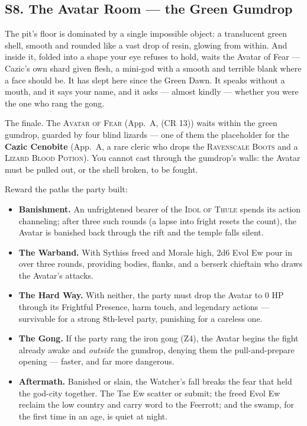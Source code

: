 \documentclass[10pt,twoside]{article}
\newcommand{\CR}[1]{\textnormal{(CR #1)}}
\newcommand{\eqname}[1]{\textsc{#1}}
\begin{document}
\subsection{S8. The Avatar Room --- the Green Gumdrop}
\begin{readaloud}
The pit's floor is dominated by a single impossible object: a translucent green shell,
smooth and rounded like a vast drop of resin, glowing from within. And inside it,
folded into a shape your eye refuses to hold, waits the Avatar of Fear --- Cazic's own
shard given flesh, a mini-god with a smooth and terrible blank where a face should be.
It has slept here since the Green Dawn. It speaks without a mouth, and it says your
name, and it asks --- almost kindly --- whether you were the one who rang the gong.
\end{readaloud}
The finale. The \eqname{Avatar of Fear} (App.\ A, \CR{13}) waits within the green
gumdrop, guarded by four blind lizards --- one of them the placeholder for the
\textbf{Cazic Cenobite} (App.\ A, a rare cleric who drops the \eqname{Ravenscale
Boots} and a \eqname{Lizard Blood Potion}). You cannot cast through the gumdrop's
walls: the Avatar must be pulled out, or the shell broken, to be fought.

\begin{dmnote}
Reward the paths the party built:
\begin{itemize}
\item \textbf{Banishment.} An unfrightened bearer of the \eqname{Idol of Thule} spends
its action channeling; after three such rounds (a lapse into fright resets the count),
the Avatar is banished back through the rift and the temple falls silent.
\item \textbf{The Warband.} With Sythiss freed and Morale high, 2d6 Evol Ew pour in
over three rounds, providing bodies, flanks, and a berserk chieftain who draws the
Avatar's attacks.
\item \textbf{The Hard Way.} With neither, the party must drop the Avatar to 0 HP
through its Frightful Presence, harm touch, and legendary actions --- survivable for a
strong 8th-level party, punishing for a careless one.
\item \textbf{The Gong.} If the party rang the iron gong (Z4), the Avatar begins the
fight already awake and \emph{outside} the gumdrop, denying them the pull-and-prepare
opening --- faster, and far more dangerous.
\item \textbf{Aftermath.} Banished or slain, the Watcher's fall breaks the fear that
held the god-city together. The Tae Ew scatter or submit; the freed Evol Ew reclaim
the low country and carry word to the Feerrott; and the swamp, for the first time in
an age, is quiet at night.
\end{itemize}
\end{dmnote}
\end{document}
